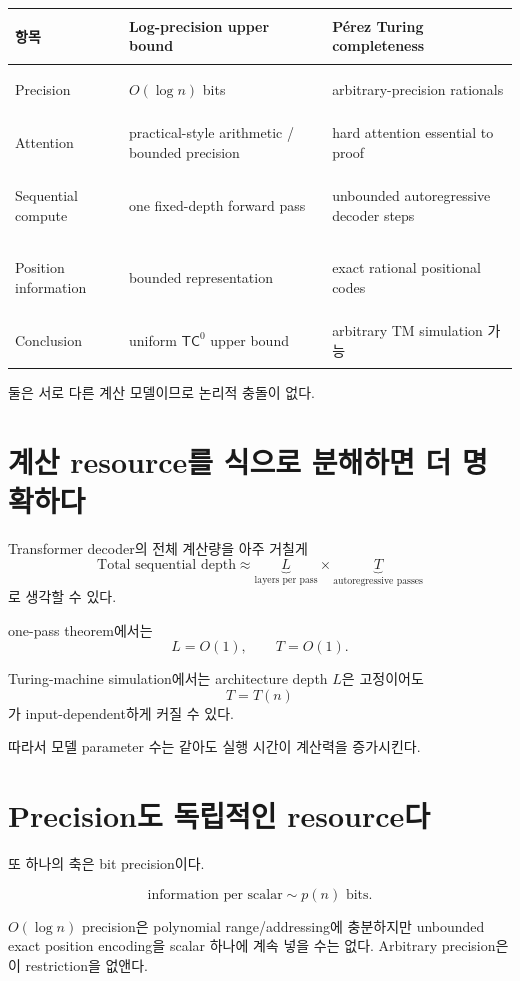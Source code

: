 \documentclass[11pt,a4paper,oneside,openany]{memoir}
\theoremstyle{definition}
\newcommand{\TC}{\mathsf{TC}}
\begin{document}
\begin{center}
\small
\begin{tabularx}{\textwidth}{>{\bfseries\raggedright\arraybackslash}p{}Y Y}
\toprule
항목 & Log-precision upper bound & Pérez Turing completeness \\
\midrule
Precision & $O(\log n)$ bits & arbitrary-precision rationals \\
Attention & practical-style arithmetic / bounded precision & hard attention essential to proof \\
Sequential compute & one fixed-depth forward pass & unbounded autoregressive decoder steps \\
Position information & bounded representation & exact rational positional codes \\
Conclusion & uniform $\TC^0$ upper bound & arbitrary TM simulation 가능 \\
\bottomrule
\end{tabularx}
\end{center}

둘은 서로 다른 계산 모델이므로 논리적 충돌이 없다.

\section{계산 resource를 식으로 분해하면 더 명확하다}

Transformer decoder의 전체 계산량을 아주 거칠게
\[
\text{Total sequential depth}
\approx
\underbrace{L}_{\text{layers per pass}}
\times
\underbrace{T}_{\text{autoregressive passes}}
\]
로 생각할 수 있다.

one-pass theorem에서는
\[
L=O(1),\qquad T=O(1).
\]

Turing-machine simulation에서는 architecture depth $L$은 고정이어도
\[
T=T(n)
\]
가 input-dependent하게 커질 수 있다.

따라서 모델 parameter 수는 같아도 실행 시간이 계산력을 증가시킨다.

\section{Precision도 독립적인 resource다}

또 하나의 축은 bit precision이다.

\[
\text{information per scalar}\sim p(n)\text{ bits}.
\]

$O(\log n)$ precision은 polynomial range/addressing에 충분하지만 unbounded exact position encoding을 scalar 하나에 계속 넣을 수는 없다.
Arbitrary precision은 이 restriction을 없앤다.
\end{document}
